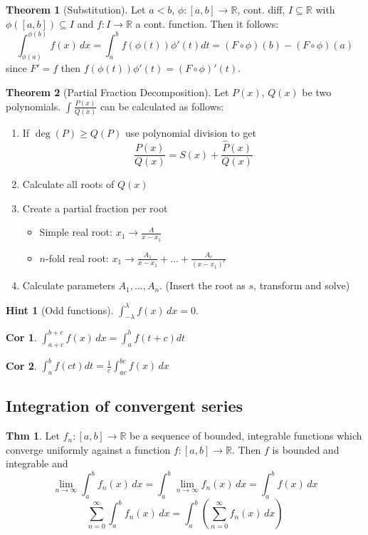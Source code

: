 \documentclass[a4paper, 10pt]{article}
\newtheorem*{corollary}{Cor}
\theoremstyle{definition}
\newtheorem*{theorem}{Thm}
\newtheorem*{note_wrapper}{Hint}
\theoremstyle{ex}
\theoremstyle{named}
\newtheorem*{ntheorem_wrapper}{Theorem}
\newenvironment{ntheorem}%
    {\begin{mdframed}[style=important]\begin{ntheorem_wrapper}}%
    {\end{ntheorem_wrapper}\end{mdframed}}
\newenvironment{note}%
    {\begin{mdframed}[style=trick]\begin{note_wrapper}}%
    {\end{note_wrapper}\end{mdframed}}
\newcommand{\R}{\mathbb{R}}
\begin{document}
\begin{ntheorem}[Substitution]
    Let $a < b$, $\phi: [a, b] \to \R$, cont. diff, $I \subseteq \R$ with $\phi([a, b]) \subseteq I$ and $f: I \to \R$ a cont. function. Then it follows:
    $$\int_{\phi(a)}^{\phi(b)} f(x) \,dx = \int_a^b f(\phi(t)) \phi'(t) dt = (F \circ \phi)(b) - (F \circ \phi)(a)$$
    since $F'=f$ then $f(\phi(t))\phi'(t) = (F \circ \phi)'(t)$.
\end{ntheorem}

\begin{ntheorem}[Partial Fraction Decomposition]
    Let $P(x)$, $Q(x)$ be two polynomials. $\int \frac{P(x)}{Q(x)}$ can be calculated as follows:
    \begin{enumerate}
        \item If $\deg(P) \geq Q(P)$ use polynomial division to get
        $$\frac{P(x)}{Q(x)} = S(x) + \frac{\hat{P}(x)}{Q(x)}$$
        \item Calculate all roots of $Q(x)$
        \item Create a partial fraction per root
        \begin{itemize}
            \item Simple real root: $x_1 \to \frac{A}{x - x_1}$
            \item $n$-fold real root: $x_1 \to \frac{A_1}{x - x_1} + \ldots + \frac{A_r}{(x - x_1)^r}$
        \end{itemize}
        \item Calculate parameters $A_1, \ldots, A_n$. (Insert the root as $s$, transform and solve)
    \end{enumerate}
\end{ntheorem}

\begin{note}[Odd functions]
    $\int_{-\lambda}^\lambda f(x) \, dx = 0$.
\end{note}

\begin{corollary}
    $\int_{a + c}^{b + c} f(x) \,dx = \int_a^b f(t + c) dt$
\end{corollary}

\begin{corollary}
    $\int_a^b f(ct) dt = \frac{1}{c} \int_{ac}^{bc} f(x) \,dx$
\end{corollary}

\subsection{Integration of convergent series}
\begin{theorem}
    Let $f_n: [a, b] \to \R$ be a sequence of bounded, integrable functions which converge uniformly against a function $f: [a, b] \to \R$. Then $f$ is bounded and integrable and
    $$\lim_{n \to \infty} \int_a^b f_n(x) \,dx = \int_a^b \lim_{n \to \infty}  f_n(x) \,dx = \int_a^b f(x) \,dx$$
    $$\sum_{n=0}^\infty \int_a^b f_n(x)\,dx = \int_a^b\left(\sum_{n=0}^\infty f_n(x)\,dx\right)$$
\end{theorem}
\end{document}
